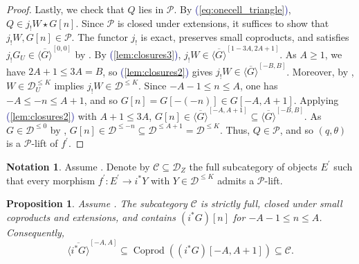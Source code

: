 \documentclass[11pt]{amsart}
\def\eqref#1{\textcolor{darkblue}{(\ref{#1})}}
\theoremstyle{plain}
\newtheorem{proposition}[theorem]{Proposition}
\theoremstyle{definition}
\newtheorem{notation}[theorem]{Notation}
\numberwithin{equation}{section}
\numberwithin{theorem}{section}
\begin{document}
\begin{proof}
    Lastly, we check that $Q$ lies in $\mathcal{P}$.
    By \eqref{eq:onecell_triangle}, $Q\in j_! W\star G[n]$.
    Since $\mathcal{P}$ is closed under extensions, it suffices to show that $j_! W, G[n]\in \mathcal{P}$.
    The functor $j_!$ is exact, preserves small coproducts, and satisfies $j_! G_U\in \overline{\langle G\rangle}^{[0,0]}$ by .
    By \eqref{lem:closures3}, $j_! W\in \overline{\langle G\rangle}^{[1-3A,2A+1]}$.
    As $A\geq 1$, we have $2A+1\leq 3A = B$, so \eqref{lem:closures2} gives $j_! W\in \overline{\langle G\rangle}^{[-B,B]}$.
    Moreover, by , $W\in \mathcal{D}_U^{\leq K}$ implies $j_! W\in \mathcal{D}^{\leq K}$.
    Since $-A-1\leq n\leq A$, one has $-A\leq -n\leq A+1$, and so $G[n] = G[-(-n)]\in G[-A,A+1]$.
    Applying \eqref{lem:closures2} with $A+1\leq 3A$, $G[n]\in \overline{\langle G\rangle}^{[-A,A+1]}\subseteq \overline{\langle G\rangle}^{[-B,B]}$.
    As $G\in \mathcal{D}^{\leq 0}$ by , $G[n]\in \mathcal{D}^{\leq -n}\subseteq \mathcal{D}^{\leq A+1} = \mathcal{D}^{\leq K}$.
    Thus, $Q\in \mathcal{P}$, and so $(q,\theta)$ is a $\mathcal{P}$-lift of $f^\prime$.
\end{proof}

\begin{notation}
    Assume . 
    Denote by $\mathcal{C}\subseteq \mathcal{D}_Z$ the full subcategory of objects $E^\prime$ such that every morphism $f^\prime \colon E^\prime \to i^\ast Y$ with $Y\in \mathcal{D}^{\leq K}$ admits a $\mathcal{P}$-lift.
\end{notation}

\begin{proposition}
    \label{prop:closure}
    Assume . 
    The subcategory $\mathcal{C}$ is strictly full, closed under small coproducts and extensions, and contains $(i^\ast G)[n]$ for $-A-1\leq n\leq A$.
    Consequently,
    \begin{displaymath}
        \overline{\langle i^\ast G\rangle}^{[-A,A]}\subseteq \operatorname{Coprod}((i^\ast G)[-A,A+1])\subseteq \mathcal{C}.
    \end{displaymath}
\end{proposition}
\end{document}
